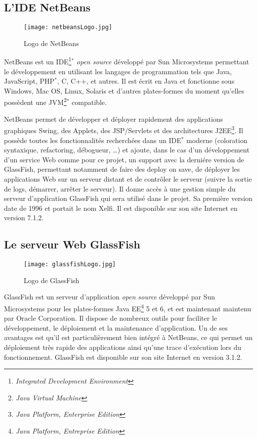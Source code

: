 \subsection{L'IDE NetBeans}
\label{section:netbeans}

\begin{figure}[!ht]
	\centering
	\texttt{[image: netbeansLogo.jpg]}
	\caption{Logo de NetBeans}

\end{figure}

NetBeans est un IDE\protect\footnote{\textit{Integrated Development Environment}}$^*$ \textit{open source} d\'evelopp\'e par Sun Microsystems permettant le d\'eveloppement en utilisant les langages de programmation tels que Java, JavaScript, PHP$^*$, C, C++, et autres.
Il est \'ecrit en Java et fonctionne sous Windows, Mac OS, Linux, Solaris et d'autres plates-formes du moment qu'elles poss\`edent une JVM\protect\footnote{\textit{Java Virtual Machine}}$^*$ compatible.

NetBeans permet de d\'evelopper et d\'eployer rapidement des applications graphiques Swing, des Applets, des JSP/Servlets et des architectures J2EE\protect\footnote{\textit{Java Platform, Enterprise Edition}}.
Il poss\`ede toutes les fonctionnalit\'es recherch\'ees dans un IDE$^*$ moderne (coloration syntaxique, refactoring, d\'ebogueur, \ldots) et ajoute, dans le cas d'un d\'eveloppement d'un service Web comme pour ce projet, un support avec la derni\'ere version de GlassFish, permettant notamment de faire des {\og}deploy on save{\fg}, de d\'eployer les applications Web sur un serveur distant et de contr\^oler le serveur (suivre la sortie de logs, d\'emarrer, arr\^eter le serveur). 
Il donne acc\`es \`a une gestion simple du serveur d'application GlassFish qui sera utilis\'e dans le projet.
Sa premi\`ere version date de 1996 et portait le nom Xelfi. 
Il est disponible sur son site Internet\cite{biblio:siteNetbeans} en version 7.1.2.

\subsection{Le serveur Web GlassFish}
\label{section:glassfish}

\begin{figure}[!ht]
	\centering
	\texttt{[image: glassfishLogo.jpg]}
	\caption{Logo de GlassFish}

\end{figure}

GlassFish est un serveur d'application \textit{open source} d\'evelopp\'e par Sun Microsystems pour les plates-formes Java EE\protect\footnote{\textit{Java Platform, Entreprise Edition}} 5 et 6, et est maintenant maintenu par Oracle Corporation.
Il dispose de nombreux outils pour faciliter le d\'eveloppement, le d\'eploiement et la maintenance d'application.
Un de ses avantages est qu'il est particuli\`erement bien int\'egr\'e \`a NetBeans, ce qui permet un d\'eploiement tr\`es rapide des applications ainsi qu'une trace d'ex\'ecution lors du fonctionnement.
GlassFish est disponible sur son site Internet\cite{biblio:siteGlassfish} en version 3.1.2.

